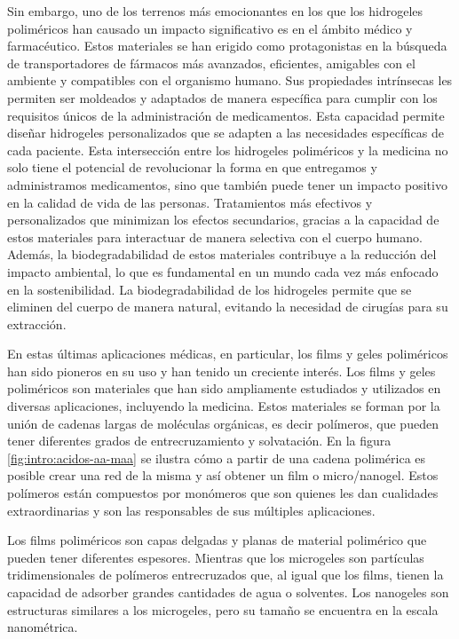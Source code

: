 Sin embargo, uno de los terrenos m\'as emocionantes en los que los hidrogeles polim\'ericos han causado un impacto significativo es en el \'ambito m\'edico y farmac\'eutico. Estos materiales se han erigido como protagonistas en la b\'usqueda de transportadores de f\'armacos m\'as avanzados, eficientes, amigables con el ambiente y compatibles con el organismo humano. Sus propiedades intr\'insecas les permiten ser moldeados y adaptados de manera espec\'ifica para cumplir con los requisitos \'unicos de la administraci\'on de medicamentos.
Esta capacidad permite dise\~nar hidrogeles personalizados que se adapten a las necesidades espec\'ificas de cada paciente.
Esta intersecci\'on entre los hidrogeles polim\'ericos y la medicina no solo tiene el potencial de revolucionar la forma en que entregamos y administramos medicamentos, sino que tambi\'en puede tener un impacto positivo en la calidad de vida de las personas. Tratamientos m\'as efectivos y personalizados que minimizan los efectos secundarios, gracias a la capacidad de estos materiales para interactuar de manera selectiva con el cuerpo humano. Adem\'as, la biodegradabilidad de estos materiales contribuye a la reducci\'on del impacto ambiental, lo que es fundamental en un mundo cada vez m\'as enfocado en la sostenibilidad.
La biodegradabilidad de los hidrogeles permite que se eliminen del cuerpo de manera natural, evitando la necesidad de cirug\'ias para su extracci\'on.

En estas \'ultimas aplicaciones m\'edicas, en particular, los films y geles polim\'ericos han sido pioneros en su uso y han tenido un creciente inter\'es.
Los films y geles polim\'ericos son materiales que han sido ampliamente estudiados y utilizados en diversas aplicaciones, incluyendo la medicina.
Estos materiales se forman por la uni\'on de cadenas largas de mol\'eculas org\'anicas, es decir pol\'imeros, que pueden tener diferentes grados de entrecruzamiento y solvataci\'on. En la figura \ref{fig:intro:acidos-aa-maa} se ilustra c\'omo a partir de una cadena polim\'erica es posible crear una red de la misma y as\'i obtener un film o micro/nanogel. Estos pol\'imeros est\'an compuestos por mon\'omeros que son quienes les dan cualidades extraordinarias y son las responsables de sus m\'ultiples aplicaciones.

Los films polim\'ericos son capas delgadas y planas de material polim\'erico que pueden tener diferentes espesores. Mientras que los microgeles son part\'iculas tridimensionales de pol\'imeros entrecruzados que, al igual que los films, tienen la capacidad de adsorber grandes cantidades de agua o solventes. Los nanogeles son estructuras similares a los microgeles, pero su tama\~no se encuentra en la escala nanom\'etrica.



